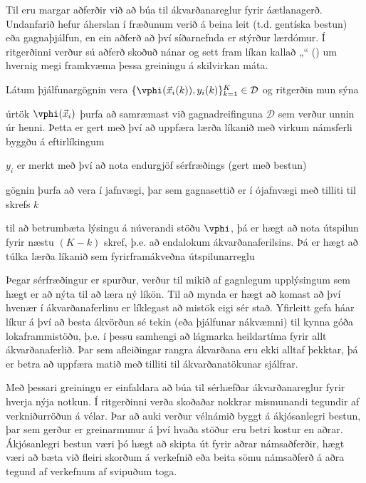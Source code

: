 Til eru margar aðferðir við að búa til ákvarðanareglur fyrir áætlanagerð. 
Undanfarið hefur áherslan í fræðunum verið á beina leit (t.d. gentíska bestun) 
eða gagnaþjálfun, en ein aðferð að því síðarnefnda er stýrður lærdómur.
Í ritgerðinni verður sú aðferð skoðuð nánar og sett fram líkan kallað 
„\fullnameAlice“ (\Alice) um hvernig megi 
framkvæma þessa greiningu á skilvirkan máta. 

Látum þjálfunargögnin vera 
\mbox{$\{\vphi(\vec{x}_i(k)),y_i(k)\}_{k=1}^K\in\mathcal{D}$} og ritgerðin mun 
sýna
\begin{enumerate*}[itemjoin*={{ og }}]
    \item úrtök $\vphi(\vec{x}_i)$ þurfa að samræmast við gagnadreifinguna 
    $\mathcal{D}$ sem verður unnin úr henni. Þetta er gert með því að uppfæra 
    lærða líkanið með virkum námsferli byggðu á eftirlíkingum
    \item $y_i$ er merkt með því að nota endurgjöf sérfræðings (gert með bestun)
    \item gögnin þurfa að vera í jafnvægi, þar sem gagnasettið er í ójafnvægi 
    með tilliti til skrefs $k$
    \item til að betrumbæta lýsingu á núverandi stöðu $\vphi$, þá er hægt að 
    nota útspilun fyrir næstu 
    $(K-k)$ skref, þ.e. að endalokum ákvarðanaferilsins. Þá er hægt að túlka 
    lærða líkanið sem fyrirframákveðna útspilunarreglu
\end{enumerate*}

Þegar sérfræðingur er spurður, verður til mikið af gagnlegum upplýsingum sem 
hægt er að nýta til að læra ný líkön. Til að mynda er hægt að komast að því 
hvenær í ákvarðana\-ferlinu er líklegast að mistök eigi sér stað. Yfirleitt 
gefa háar líkur á því að besta ákvörðun sé tekin (eða þjálfunar nákvæmni) til 
kynna góða lokaframmistöðu, þ.e. í þessu samhengi að lágmarka heildartíma fyrir 
allt ákvarðanaferlið. 
Þar sem afleiðingar rangra ákvarðana eru ekki alltaf þekktar, 
þá er betra að uppfæra matið með tilliti til ákvarðanatökunar sjálfrar.

Með þessari greiningu er einfaldara að búa til sérhæfðar ákvarðanareglur fyrir 
hverja nýja notkun. Í ritgerðinni verða skoðaðar nokkrar mismunandi tegundir af 
verkniðurröðun á vélar. 
Þar að auki verður vélnámið byggt á ákjósanlegri bestun, þar sem gerður er 
greinar\-munur á því hvaða stöður eru betri kostur en aðrar. Ákjósanlegri 
bestun væri þó hægt að skipta út fyrir aðrar námsaðferðir, hægt væri að bæta 
við fleiri skorðum á verkefnið eða beita sömu námsaðferð á aðra tegund af 
verkefnum af svipuðum toga. 

